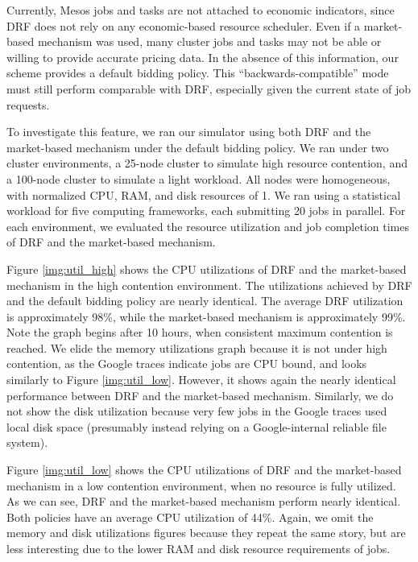 \documentclass{acm_proc_article-sp}
\begin{document}
Currently, Mesos jobs and tasks are not attached to economic indicators, since DRF does not rely on any economic-based resource scheduler. Even if a market-based mechanism was used, many cluster jobs and tasks may not be able or willing to provide accurate pricing data. In the absence of this information, our scheme provides a default bidding policy. This ``backwards-compatible'' mode must still perform comparable with DRF, especially given the current state of job requests.

To investigate this feature, we ran our simulator using both DRF and the market-based mechanism under the default bidding policy. We ran under two cluster environments, a 25-node cluster to simulate high resource contention, and a 100-node cluster to simulate a light workload. All nodes were homogeneous, with normalized CPU, RAM, and disk resources of 1. We ran using a statistical workload for five computing frameworks, each submitting 20 jobs in parallel. For each environment, we evaluated the resource utilization and job completion times of DRF and the market-based mechanism.

Figure \ref{img:util_high} shows the CPU utilizations of DRF and the market-based mechanism in the high contention environment.  The utilizations achieved by DRF and the default bidding policy are nearly identical. The average DRF utilization is approximately 98\%, while the market-based mechanism is approximately 99\%. Note the graph begins after 10 hours, when consistent maximum contention is reached. We elide the memory utilizations graph because it is not under high contention, as the Google traces indicate jobs are CPU bound, and looks similarly to Figure \ref{img:util_low}. However, it shows again the nearly identical performance between DRF and the market-based mechanism. Similarly, we do not show the disk utilization because very few jobs in the Google traces used local disk space (presumably instead relying on a Google-internal reliable file system).

Figure \ref{img:util_low} shows the CPU utilizations of DRF and the market-based mechanism in a low contention environment, when no resource is fully utilized. As we can see, DRF and the market-based mechanism perform nearly identical. Both policies have an average CPU utilization of 44\%. Again, we omit the memory and disk utilizations figures because they repeat the same story, but are less interesting due to the lower RAM and disk resource requirements of jobs.
\end{document}
